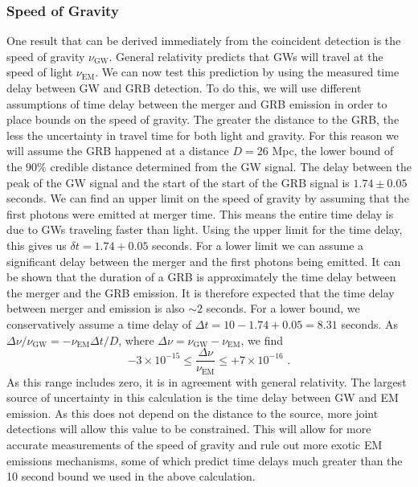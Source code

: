 \documentclass[11pt]{cuthesis}
\newcommand{\fs}{\text{ .}}
\begin{document}
\subsubsection{Speed of Gravity}
One result that can be derived immediately from the coincident detection is the speed of gravity $\nu_\text{GW}$. General relativity predicts that GWs will travel at the speed of light $\nu_\text{EM}$. We can now test this prediction by using the measured time delay between GW and GRB detection. To do this, we will use different assumptions of time delay between the merger and GRB emission in order to place bounds on the speed of gravity. The greater the distance to the GRB, the less the uncertainty in travel time for both light and gravity. For this reason we will assume the GRB happened at a distance $D = 26$ Mpc, the lower bound of the $90\%$ credible distance determined from the GW signal.  The delay between the peak of the GW signal and the start of the start of the GRB signal is $1.74 \pm 0.05$ seconds. We can find an upper limit on the speed of gravity by assuming that the first photons were emitted at merger time. This means the entire time delay is due to GWs traveling faster than light. Using the upper limit for the time delay, this gives us $\delta t = 1.74 + 0.05$ seconds. For a lower limit we can assume a significant delay between the merger and the first photons being emitted. It can be shown that the duration of a GRB is approximately the time delay between the merger and the GRB emission\cite{GW170817_GRB}. It is therefore expected that the time delay between merger and emission is also $\sim2$ seconds. For a lower bound, we conservatively assume a time delay of $\Delta t = 10 - 1.74 + 0.05= 8.31$ seconds. As $\Delta \nu /\nu_\text{GW} = -\nu_\text{EM}\Delta t/D$, where $\Delta \nu = \nu_\text{GW} - \nu_\text{EM}$, we find
\begin{equation}
-3 \times 10^{-15} \leq \frac{\Delta \nu}{\nu_\text{EM}} \leq +7\times 10^{-16} \fs
\end{equation}
As this range includes zero, it is in agreement with general relativity. The largest source of uncertainty in this calculation is the time delay between GW and EM emission. As this does not depend on the distance to the source, more joint detections will allow this value to be constrained. This will allow for more accurate measurements of the speed of gravity and rule out more exotic EM emissions mechanisms, some of which predict time delays much greater than the 10 second bound we used in the above calculation.
\end{document}
